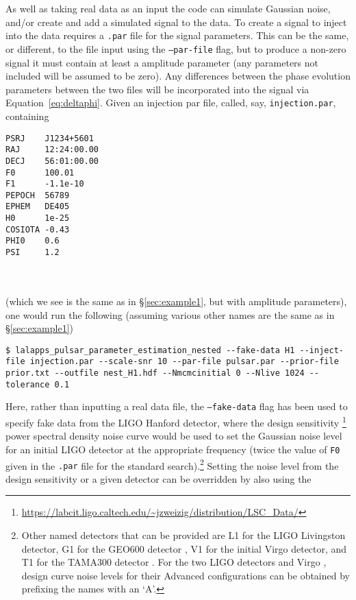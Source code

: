 As well as taking real data as an input the code can simulate Gaussian noise, and/or create and add a simulated signal to the data. To create
a signal to inject into the data requires a {\tt .par} file for the signal parameters. This can be the same, or different, to the file input
using the {\tt --par-file} flag, but to produce a non-zero signal it must contain at least a \gw amplitude parameter (any parameters not
included will be assumed to be zero). Any differences between the phase evolution parameters between the two files will be incorporated into the
signal via Equation~\ref{eq:deltaphi}. Given an injection par file, called, say, {\tt injection.par}, containing
\begin{lrbox}{\Lst}
\begin{lstlisting}
PSRJ    J1234+5601
RAJ     12:24:00.00
DECJ    56:01:00.00
F0      100.01
F1      -1.1e-10
PEPOCH  56789
EPHEM   DE405
H0      1e-25
COSIOTA -0.43
PHI0    0.6
PSI     1.2
\end{lstlisting}
\end{lrbox}
\\[5pt] \indent \fbox{\usebox{\Lst}} \\[5pt]
(which we see is the same as in \S\ref{sec:example1}, but with \gw amplitude parameters), one would run the following (assuming various other
names are the same as in \S\ref{sec:example1})
\begin{lstlisting}[frame=single]
$ lalapps_pulsar_parameter_estimation_nested --fake-data H1 --inject-file injection.par --scale-snr 10 --par-file pulsar.par --prior-file prior.txt --outfile nest_H1.hdf --Nmcmcinitial 0 --Nlive 1024 --tolerance 0.1
\end{lstlisting}
Here, rather than inputting a real data file, the {\tt --fake-data} flag has been used to specify fake data from the LIGO Hanford detector, where the
design sensitivity \citep{SRD}\footnote{\url{https://labcit.ligo.caltech.edu/~jzweizig/distribution/LSC_Data/}} power spectral density noise curve
would be used to set the Gaussian noise level for an initial LIGO detector at the appropriate \gw frequency (twice the value of {\tt F0} given in the {\tt .par}
file for the standard search).\footnote{Other
named detectors that can be provided are L1 for the LIGO Livingston detector, G1 for the GEO600 detector \citep[from Table~IV of][]{2001PhRvD..63d4023D},
V1 for the initial Virgo detector, and T1 for the TAMA300 detector \citep[from Table~IV of][]{2001PhRvD..63d4023D}. For the two LIGO detectors
\citep{aLIGOSRD} and Virgo \citep[see Equation~6 of][]{2012arXiv1202.4031M}, design curve noise levels for their Advanced configurations can be obtained
by prefixing the names with an `A'.} Setting the noise level from the design sensitivity or a given detector can be overridden by also using the
